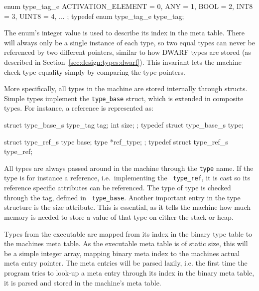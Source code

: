 \begin{ccode}
enum type_tag_e {
    ACTIVATION_ELEMENT = 0,
    ANY                = 1,
    BOOL               = 2,
    INT8               = 3,
    UINT8              = 4,
    ...
};
typedef enum type_tag_e type_tag;
\end{ccode}

The enum's integer value is used to describe its index in the meta table. There
will always only be a single instance of each type, so two equal types can never
be referenced by two different pointers, similar to how DWARF types are stored
(as described in Section~\ref{sec:design:types:dwarf}). This invariant lets the
machine check type equality simply by comparing the type pointers.

More specifically, all types in the machine are stored internally through
structs. Simple types implement the {\tt type\_base} struct, which is extended
in composite types. For instance, a reference is represented as:

\begin{ccode}
struct type_base_s {
    type_tag tag;
    int size;
};
typedef struct type_base_s type;

struct type_ref_s {
    type base;
    type *ref_type;
};
typedef struct type_ref_s type_ref;
\end{ccode}

All types are always passed around in the machine through the {\tt type}
name. If the type is for instance a reference, i.e.~implementing the {\tt
  type\_ref}, it is cast so its reference specific attributes can be
referenced. The type of type is checked through the tag, defined in {\tt
  type\_base}. Another important entry in the type structure is the size
attribute. This is essential, as it tells the machine how much memory is needed
to store a value of that type on either the stack or heap.

Types from the executable are mapped from its index in the binary type table to
the machines meta table. As the executable meta table is of static size, this
will be a simple integer array, mapping binary meta index to the machines actual
meta entry pointer. The meta entries will be parsed lazily, i.e. the first time
the program tries to look-up a meta entry through its index in the binary meta
table, it is parsed and stored in the machine's meta table.


